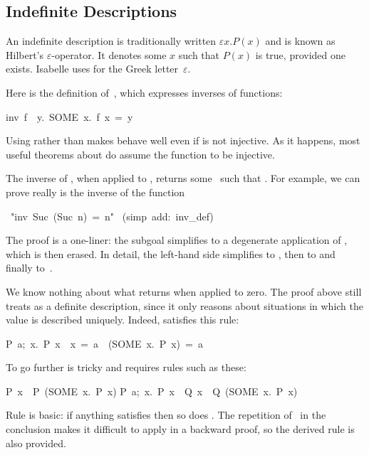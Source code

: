 \subsection{Indefinite Descriptions}

%
%
An indefinite description is traditionally written $\varepsilon x. P(x)$ and is
known as Hilbert's $\varepsilon$-operator.  It denotes
some $x$ such that $P(x)$ is true, provided one exists.
Isabelle uses  for the Greek letter~$\varepsilon$.

Here is the definition of~, which expresses inverses of
functions:
\begin{isabelle}
inv\ f\ \isasymequiv \ \isasymlambda y.\ SOME\ x.\ f\ x\ =\ y%
\end{isabelle}
Using  rather than  makes  behave well
even if  is not injective.  As it happens, most useful theorems about
 do assume the function to be injective.

The inverse of , when applied to , returns some~ such that
.  For example, we can prove  really is the inverse
of the  function 
\begin{isabelle}
\ "inv\ Suc\ (Suc\ n)\ =\ n"\isanewline
{}\ (simp\ add:\ inv_def)
\end{isabelle}

\noindent
The proof is a one-liner: the subgoal simplifies to a degenerate application of
, which is then erased.  In detail, the left-hand side simplifies
to , then to  and
finally to~.  

We know nothing about what
 returns when applied to zero.  The proof above still treats
 as a definite description, since it only reasons about
situations in which the value is described uniquely.  Indeed, 
satisfies this rule:
\begin{isabelle}
\isasymlbrakk P\ a;\ \isasymAnd x.\ P\ x\ \isasymLongrightarrow \ x\ =\ a\isasymrbrakk \ 
\isasymLongrightarrow \ (SOME\ x.\ P\ x)\ =\ a%
\end{isabelle}
To go further is
tricky and requires rules such as these:
\begin{isabelle}
P\ x\ \isasymLongrightarrow \ P\ (SOME\ x.\ P\ x)
\isanewline
\isasymlbrakk P\ a;\ \isasymAnd x.\ P\ x\ \isasymLongrightarrow \ Q\
x\isasymrbrakk \ \isasymLongrightarrow \ Q\ (SOME\ x.\ P\ x)
\rulenamedx{someI2}
\end{isabelle}
Rule  is basic: if anything satisfies  then so does
\hbox{}.  The repetition of~ in the conclusion makes it
difficult to apply in a backward proof, so the derived rule  is
also provided. 

